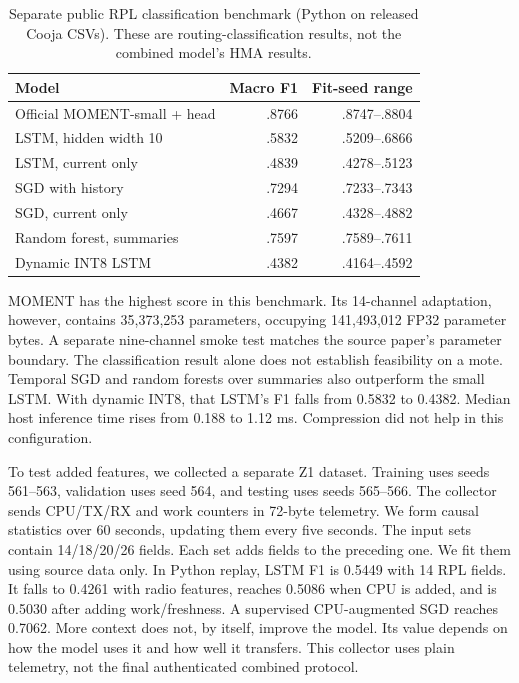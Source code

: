 \documentclass[journal]{IEEEtran}
\begin{document}
\begin{table}[t]\caption{Separate public RPL classification benchmark (Python on released Cooja CSVs). These are routing-classification results, not the combined model's HMA results.}
\label{tab:public}\centering\small
\begin{tabular}{lrr}\toprule Model & Macro F1 & Fit-seed range\\\midrule
Official MOMENT-small + head&.8766&.8747--.8804\\
LSTM, hidden width 10&.5832&.5209--.6866\\
LSTM, current only&.4839&.4278--.5123\\
SGD with history&.7294&.7233--.7343\\
SGD, current only&.4667&.4328--.4882\\
Random forest, summaries&.7597&.7589--.7611\\
Dynamic INT8 LSTM&.4382&.4164--.4592\\\bottomrule
\end{tabular}\end{table}

MOMENT has the highest score in this benchmark. Its 14-channel adaptation, however, contains 35,373,253 parameters, occupying 141,493,012 FP32 parameter bytes. A separate nine-channel smoke test matches the source paper's parameter boundary. The classification result alone does not establish feasibility on a mote. Temporal SGD and random forests over summaries also outperform the small LSTM. With dynamic INT8, that LSTM's F1 falls from 0.5832 to 0.4382. Median host inference time rises from 0.188 to 1.12 ms. Compression did not help in this configuration.

To test added features, we collected a separate Z1 dataset. Training uses seeds 561--563, validation uses seed 564, and testing uses seeds 565--566. The collector sends CPU/TX/RX and work counters in 72-byte telemetry. We form causal statistics over 60 seconds, updating them every five seconds. The input sets contain 14/18/20/26 fields. Each set adds fields to the preceding one. We fit them using source data only. In Python replay, LSTM F1 is 0.5449 with 14 RPL fields. It falls to 0.4261 with radio features, reaches 0.5086 when CPU is added, and is 0.5030 after adding work/freshness. A supervised CPU-augmented SGD reaches 0.7062. More context does not, by itself, improve the model. Its value depends on how the model uses it and how well it transfers. This collector uses plain telemetry, not the final authenticated combined protocol.
\end{document}
